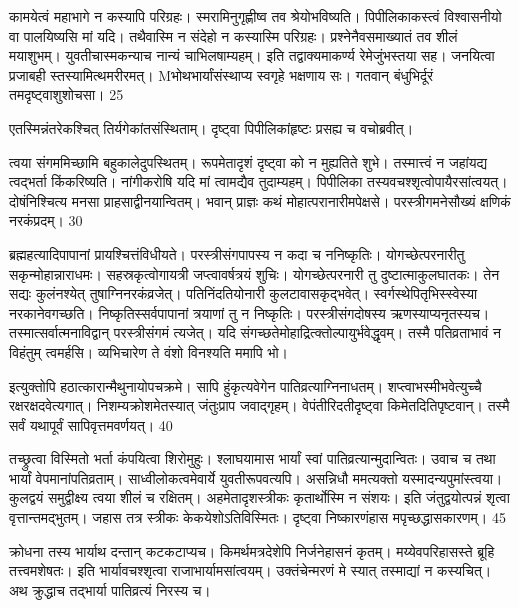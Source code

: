 कामयेत्वं महाभागे न कस्यापि परिग्रहः।
स्मरामिनुगृह्णीष्व तव श्रेयोभविष्यति।
पिपीलिकाकस्त्वं विश्वासनीयो वा पालयिष्यसि मां यदि।
तथैवास्मि न संदेहो न कस्यास्मि परिग्रहः।
प्रश्नेनैवसमाख्यातं तव शीलं मयाशुभम्।
युवतीचास्मकन्याच नान्यं चाभिलषाम्यहम्।
इति तद्वाक्यमाकर्ण्य रेमेजुंभस्तया सह।
जनयित्वा प्रजाबही स्तस्यामित्थमरीरमत्।
Mभोथभार्यांसंस्थाप्य स्वगृहे भक्षणाय सः।
गतवान् बंधुभिर्दूरं तमदृष्ट्वाशुशोचसा।
25

एतस्मिन्नंतरेकश्चित् तिर्यगेकांतसंस्थिताम्।
दृष्ट्वा पिपीलिकांहृष्टः प्रसह्य च वचोब्रवीत्।

त्वया संगममिच्छामि बहुकालेदुपस्थितम्।
रूपमेतादृशं दृष्ट्वा को न मुह्यतिते शुभे।
तस्मात्त्वं न जहांयद्य त्वद्भर्ता किंकरिष्यति।
नांगीकरोषि यदि मां त्वामद्यैव तुदाम्यहम्।
पिपीलिका तस्यवचश्शृत्वोपायैरसांत्वयत्।
दोषंनिश्चित्य मनसा प्राहसाद्वीनयान्वितम्।
भवान् प्राज्ञः कथं मोहात्परानारीमपेक्षसे।
परस्त्रीगमनेसौख्यं क्षणिकं नरकंप्रदम्।
30

ब्रह्महत्यादिपापानां प्रायश्चित्तंविधीयते।
परस्त्रीसंगपापस्य न कदा च ननिष्कृतिः।
योगच्छेत्परनारीतु सकृन्मोहान्नाराधमः।
सहस्रकृत्वोगायत्री जप्त्वावर्षत्रयं शुचिः।
योगच्छेत्परनारी तु दुष्टात्माकुलघातकः।
तेन सद्यः कुलंनश्येत् तुषाग्निनरकंव्रजेत्।
पतिनिंदतियोनारी कुलटावासकृद्भवेत्।
स्वर्गस्थेपितृभिस्स्वेस्या नरकानेवगच्छति।
निष्कृतिस्सर्वपापानां त्रयाणां तु न निष्कृतिः।
परस्त्रीसंगदोषस्य ऋणस्याप्यनृतस्यच।
तस्मात्सर्वात्मनाविद्वान् परस्त्रीसंगमं त्यजेत्।
यदि संगच्छतेमोहाद्रित्क्तोल्पायुर्भवेद्धृवम्।
तस्मै पतिव्रताभावं न विहंतुम् त्वमर्हसि।
व्यभिचारेण ते वंशो विनश्यति ममापि भो।

इत्युक्तोपि हठात्कारान्मैथुनायोपचक्रमे।
सापि हुंकृत्यवेगेन पातिव्रत्याग्निनाधतम्।
शप्त्वाभस्मीभवेत्युच्चै रक्षरक्षदवेत्यगात्।
निशम्यक्रोशमेतस्यात् जंतुःप्राप जवाद्गृहम्।
वेपंतीरिदतीदृष्ट्वा किमेतदितिपृष्टवान्।
तस्मै सर्वं यथापूर्वं सापिवृत्तमवर्णयत्।
40

तच्छ्रुत्वा विस्मितो भर्ता कंपयित्वा शिरोमुहुः।
श्लाघयामास भार्यां स्वां पातिव्रत्यान्मुदान्वितः।
उवाच च तथा भार्यां वेपमानांपतिव्रताम्।
साध्वीलोकत्वमेवार्ये युवतीरूपवत्यपि।
असन्निधौ ममत्यक्तो यस्मादन्यपुमांस्त्वया।
कुलद्वयं समुद्वीक्ष्य त्वया शीलं च रक्षितम्।
अहमेतादृशस्त्रीकः कृतार्थोस्मि न संशयः।
इति जंतुद्वयोत्पन्नं शृत्वा वृत्तान्तमद्भुतम्।
जहास तत्र स्त्रीकः केकयेशोऽतिविस्मितः।
दृष्ट्वा निष्कारणंहास मपृच्छद्धासकारणम्।
45

क्रोधना तस्य भार्याथ दन्तान् कटकटाप्यच।
किमर्थमत्रदेशेपि निर्जनेहासनं कृतम्।
मय्येवपरिहासस्ते ब्रूहि तत्त्वमशेषतः।
इति भार्यावचश्शृत्वा राजाभार्यामसांत्वयम्।
उक्तंचेन्मरणं मे स्यात् तस्माद्यां न कस्यचित्।
अथ क्रुद्धाच तद्भार्या पातिव्रत्यं निरस्य च।

